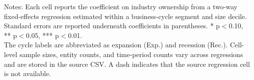 \begin{table}[!htbp]
\begin{threeparttable}
\begin{tabular}{@{}lccccccc@{}}
\bottomrule
\end{tabular}
\vspace{0.35em}
\noindent\parbox{\textwidth}{\footnotesize
Notes: Each cell reports the coefficient on industry ownership from a two-way fixed-effects regression estimated within a business-cycle segment and size decile. Standard errors are reported underneath coefficients in parentheses. * p$<$0.10, ** p$<$0.05, *** p$<$0.01.\\
The cycle labels are abbreviated as expansion (Exp.) and recession (Rec.). Cell-level sample sizes, entity counts, and time-period counts vary across regressions and are stored in the source CSV. A dash indicates that the source regression cell is not available.
}
\end{threeparttable}
\end{table}
